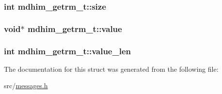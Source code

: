 \hypertarget{structmdhim__getrm__t_a850957632986ef7c1f352de7e126d6a4}{
\subsubsection[{size}]{\setlength{\rightskip}{0pt plus 5cm}int mdhim\-\_\-getrm\-\_\-t\-::size}}\label{structmdhim__getrm__t_a850957632986ef7c1f352de7e126d6a4}
\hypertarget{structmdhim__getrm__t_ae1e2ce047de1164dcdb1bcfe0f6fd0ae}{
\subsubsection[{value}]{\setlength{\rightskip}{0pt plus 5cm}void$\ast$ mdhim\-\_\-getrm\-\_\-t\-::value}}\label{structmdhim__getrm__t_ae1e2ce047de1164dcdb1bcfe0f6fd0ae}
\hypertarget{structmdhim__getrm__t_af5959ca99312966ae31a7ffec962d9ea}{
\subsubsection[{value\-\_\-len}]{\setlength{\rightskip}{0pt plus 5cm}int mdhim\-\_\-getrm\-\_\-t\-::value\-\_\-len}}\label{structmdhim__getrm__t_af5959ca99312966ae31a7ffec962d9ea}


The documentation for this struct was generated from the following file\-:\begin{DoxyCompactItemize}
\item 
src/\hyperlink{messages_8h}{messages.\-h}\end{DoxyCompactItemize}
